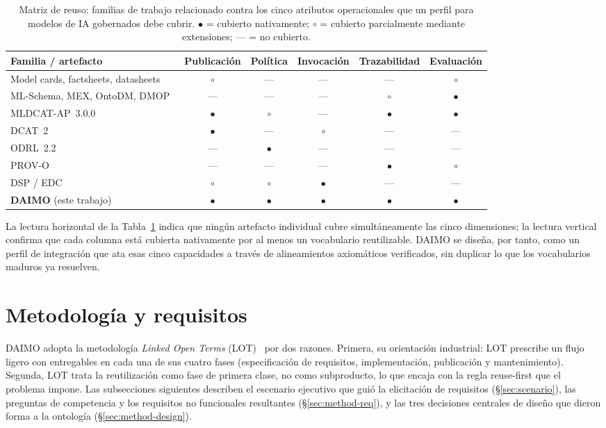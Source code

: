 \documentclass[11pt,a4paper]{article}
\begin{document}
\begin{table}[t]
\small\sf\centering
\caption{Matriz de reuso: familias de trabajo relacionado contra los cinco atributos operacionales que un perfil para modelos de IA gobernados debe cubrir. $\bullet$ = cubierto nativamente; $\circ$ = cubierto parcialmente mediante extensiones; --- = no cubierto.\label{tab:reuse-matrix}}
\begin{tabular}{@{}lccccc@{}}
\toprule
\textbf{Familia / artefacto} & \textbf{Publicación} & \textbf{Política} & \textbf{Invocación} & \textbf{Trazabilidad} & \textbf{Evaluación} \\
\midrule
Model cards, factsheets, datasheets~\cite{mitchell19,arnold19,gebru21} & $\circ$ & --- & --- & --- & $\circ$ \\
ML-Schema, MEX, OntoDM, DMOP~\cite{mls,mex,ontodm,dmop} & --- & --- & --- & $\circ$ & $\bullet$ \\
MLDCAT-AP~3.0.0~\cite{mldcatap} & $\bullet$ & $\circ$ & --- & $\bullet$ & $\bullet$ \\
DCAT~2~\cite{dcat2} & $\bullet$ & --- & $\circ$ & --- & --- \\
ODRL~2.2~\cite{odrl22} & --- & $\bullet$ & --- & --- & --- \\
PROV-O~\cite{provo} & --- & --- & --- & $\bullet$ & $\circ$ \\
DSP / EDC~\cite{dsp,edc} & $\circ$ & $\circ$ & $\bullet$ & --- & --- \\
\midrule
\textbf{DAIMO} (este trabajo) & $\bullet$ & $\bullet$ & $\bullet$ & $\bullet$ & $\bullet$ \\
\bottomrule
\end{tabular}
\end{table}

La lectura horizontal de la Tabla~\ref{tab:reuse-matrix} indica que ningún artefacto individual cubre simultáneamente las cinco dimensiones; la lectura vertical confirma que cada columna está cubierta nativamente por al menos un vocabulario reutilizable. DAIMO se diseña, por tanto, como un perfil de integración que ata esas cinco capacidades a través de alineamientos axiomáticos verificados, sin duplicar lo que los vocabularios maduros ya resuelven.

\section{Metodología y requisitos}\label{sec:method}

DAIMO adopta la metodología \emph{Linked Open Terms} (LOT)~\cite{lot22} por dos razones. Primera, su orientación industrial: LOT prescribe un flujo ligero con entregables en cada una de sus cuatro fases (especificación de requisitos, implementación, publicación y mantenimiento). Segunda, LOT trata la reutilización como fase de primera clase, no como subproducto, lo que encaja con la regla reuse-first que el problema impone. Las subsecciones siguientes describen el escenario ejecutivo que guió la elicitación de requisitos (§\ref{sec:scenario}), las preguntas de competencia y los requisitos no funcionales resultantes (§\ref{sec:method-req}), y las tres decisiones centrales de diseño que dieron forma a la ontología (§\ref{sec:method-design}).
\end{document}
